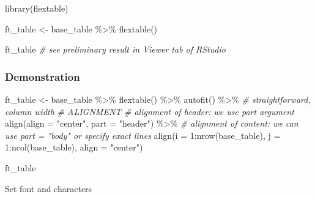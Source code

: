 \documentclass[
]{book}
\newenvironment{Shaded}{\begin{snugshade}}{\end{snugshade}}
\newcommand{\AttributeTok}[1]{\textcolor[rgb]{0.77,0.63,0.00}{#1}}
\newcommand{\CommentTok}[1]{\textcolor[rgb]{0.56,0.35,0.01}{\textit{#1}}}
\newcommand{\DecValTok}[1]{\textcolor[rgb]{0.00,0.00,0.81}{#1}}
\newcommand{\FunctionTok}[1]{\textcolor[rgb]{0.00,0.00,0.00}{#1}}
\newcommand{\NormalTok}[1]{#1}
\newcommand{\OtherTok}[1]{\textcolor[rgb]{0.56,0.35,0.01}{#1}}
\newcommand{\SpecialCharTok}[1]{\textcolor[rgb]{0.00,0.00,0.00}{#1}}
\newcommand{\StringTok}[1]{\textcolor[rgb]{0.31,0.60,0.02}{#1}}
\begin{document}
\begin{Shaded}
\begin{Highlighting}[]
\FunctionTok{library}\NormalTok{(flextable)}

\NormalTok{ft\_table }\OtherTok{\textless{}{-}}\NormalTok{ base\_table }\SpecialCharTok{\%\textgreater{}\%}
  \FunctionTok{flextable}\NormalTok{()}

\NormalTok{ft\_table }\CommentTok{\# see preliminary result in Viewer tab of RStudio}
\end{Highlighting}
\end{Shaded}

\hypertarget{demonstration}{%
\subsubsection{Demonstration}\label{demonstration}}

\begin{Shaded}
\begin{Highlighting}[]
\NormalTok{ft\_table }\OtherTok{\textless{}{-}}\NormalTok{ base\_table }\SpecialCharTok{\%\textgreater{}\%}
  \FunctionTok{flextable}\NormalTok{() }\SpecialCharTok{\%\textgreater{}\%}
  \FunctionTok{autofit}\NormalTok{() }\SpecialCharTok{\%\textgreater{}\%} \CommentTok{\# straightforward, column width}
  \CommentTok{\# ALIGNMENT}
  \CommentTok{\# alignment of header: we use part argument}
  \FunctionTok{align}\NormalTok{(}\AttributeTok{align =} \StringTok{"center"}\NormalTok{, }\AttributeTok{part =} \StringTok{"header"}\NormalTok{) }\SpecialCharTok{\%\textgreater{}\%}
  \CommentTok{\# alignment of content: we can use part = "body" or specify exact lines }
  \FunctionTok{align}\NormalTok{(}\AttributeTok{i =} \DecValTok{1}\SpecialCharTok{:}\FunctionTok{nrow}\NormalTok{(base\_table), }\AttributeTok{j =} \DecValTok{1}\SpecialCharTok{:}\FunctionTok{ncol}\NormalTok{(base\_table), }\AttributeTok{align =} \StringTok{"center"}\NormalTok{) }

\NormalTok{ft\_table}
\end{Highlighting}
\end{Shaded}

Set font and characters
\end{document}

